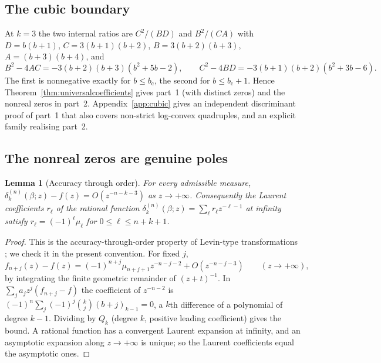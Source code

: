 \documentclass[11pt,a4paper]{article}
\newtheorem{lemma}[theorem]{Lemma}
\theoremstyle{definition}
\theoremstyle{remark}
\newcommand{\bc}{b_{\mathrm c}}
\begin{document}
\subsection{The cubic boundary}\label{sec:cubic}
At $k=3$ the two internal ratios are
$C^2/(BD)$ and $B^2/(CA)$ with $D=b(b+1)$, $C=3(b+1)(b+2)$,
$B=3(b+2)(b+3)$, $A=(b+3)(b+4)$, and
\[
 B^2-4AC=-3(b+2)(b+3)(b^2+5b-2),\qquad C^2-4BD=-3(b+1)(b+2)(b^2+3b-6).
\]
The first is nonnegative exactly for $b\le\bc$, the second for
$b\le\bc+1$. Hence Theorem~\ref{thm:universalcoefficients} gives part~1
(with distinct zeros) and the nonreal zeros in part~2. Appendix~\ref{app:cubic}
gives an independent discriminant proof of part~1 that also covers
non-strict log-convex quadruples, and an explicit family realising part~2.

\subsection{The nonreal zeros are genuine poles}\label{sec:genuine}

\begin{lemma}[Accuracy through order]\label{lem:accuracy}
For every admissible measure,
$\delta_k^{(n)}(\beta;z)-f(z)=O(z^{-n-k-3})$ as $z\to+\infty$. Consequently
the Laurent coefficients $r_\ell$ of the rational function
$\delta_k^{(n)}(\beta;z)=\sum_\ell r_\ell z^{-\ell-1}$ at infinity satisfy
$r_\ell=(-1)^\ell\mu_\ell$ for $0\le\ell\le n+k+1$.
\end{lemma}
\begin{proof}
This is the accuracy-through-order property of Levin-type transformations
\cite[\S6.3, Thm.~8]{Homeier2000}; we check it in the present convention.
For fixed $j$,
\[
 f_{n+j}(z)-f(z)=(-1)^{n+j}\mu_{n+j+1}z^{-n-j-2}+O(z^{-n-j-3})\qquad(z\to+\infty),
\]
by integrating the finite geometric remainder of $(z+t)^{-1}$.
In $\sum_ja_jz^j(f_{n+j}-f)$ the coefficient of $z^{-n-2}$ is
$(-1)^n\sum_j(-1)^j\binom kj(b+j)_{k-1}=0$, a $k$th difference of a
polynomial of degree $k-1$. Dividing by $Q_k$ (degree $k$, positive
leading coefficient) gives the bound. A rational function has a
convergent Laurent expansion at infinity, and an asymptotic expansion along
$z\to+\infty$ is unique; so the Laurent coefficients equal the asymptotic
ones.
\end{proof}
\end{document}
